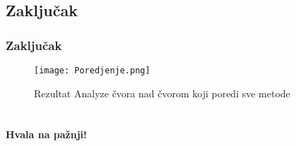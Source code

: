 \documentclass{beamer}
\begin{document}
\subsection*{Zaključak}
\begin{frame}[fragile]
\frametitle{Zaključak}
\begin{figure}[ht!]
    \centering
    \texttt{[image: Poredjenje.png]}
    \caption{Rezultat Analyze čvora nad čvorom koji poredi sve metode}
    \label{fig:PoredjenjeTabela}
\end{figure}
\end{frame}

\section{}
\begin{frame}{}
 \begin{center}
 	\textbf {Hvala na pažnji!}
 \end{center}
\end{frame}
\end{document}
